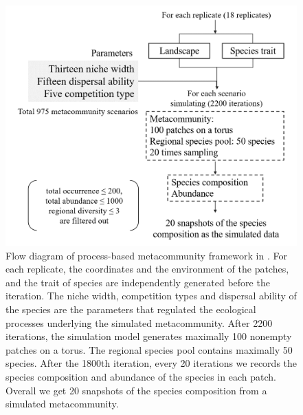 	\begin{figure}
		\centering
		\includegraphics[width=0.7\linewidth]{./figures/ppt/Thompson.png}
		\caption[Flow diagram of process-based metacommunity framework in \citet{thompson2020process}.]{\small
			Flow diagram of process-based metacommunity framework in \citet{thompson2020process}. For each replicate, the coordinates and the environment of the patches, and the trait of species are independently generated before the iteration. The niche width, competition types and dispersal ability of the species are the parameters that regulated the ecological processes underlying the simulated metacommunity. After 2200 iterations, the simulation model generates maximally 100 nonempty patches on a torus. The regional species pool contains maximally 50 species. After the 1800th iteration, every 20 iterations we records the species composition and abundance of the species in each patch. Overall we get 20 snapshots of the species composition from a simulated metacommunity.}
		\label{fig:thompson}
	\end{figure}
	
	
